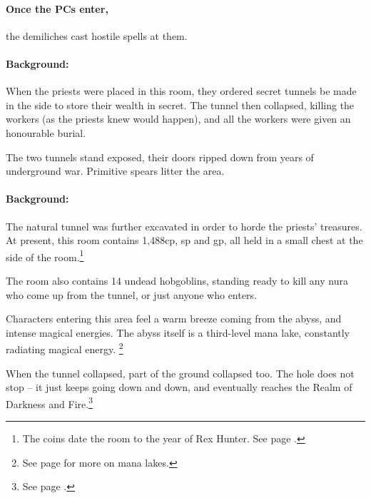 \begin{multicols}{2}
\begin{boxtext}
\end{boxtext}


\paragraph{Once the PCs enter,}
the demiliches cast hostile spells at them.


\paragraph{Background:}
When the priests were placed in this room, they ordered secret tunnels be made in the side to store their wealth in secret.
The tunnel then collapsed, killing the workers (as the priests knew would happen), and all the workers were given an honourable burial.

The two tunnels stand exposed, their doors ripped down from years of underground war.
Primitive spears litter the area.


\paragraph{Background:}
The natural tunnel was further excavated in order to horde the priests' treasures.
At present, this room contains 1,488cp, \thepage sp and  gp, all held in a small chest at the side of the room.\footnote{The coins date the room to the year of Rex Hunter.
See page \pageref{r_hunter}.}

The room also contains 14 undead hobgoblins, standing ready to kill any nura who come up from the tunnel, or just anyone who enters.



Characters entering this area feel a warm breeze coming from the abyss, and intense magical energies.
The abyss itself is a third-level mana lake, constantly radiating magical energy.%
\footnote{See page \pageref{mana_lake} for more on mana lakes.}

\begin{exampletext}

When the tunnel collapsed, part of the ground collapsed too.
The hole does not stop -- it just keeps going down and down, and eventually reaches the Realm of Darkness and Fire.\footnote{See page \pageref{darknessandfire}.}


\end{exampletext}
\end{multicols}
